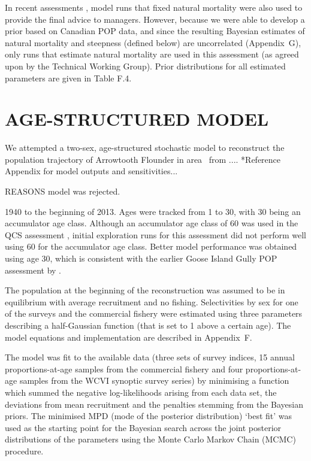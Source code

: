 In recent assessments , model runs that fixed natural mortality were also used to provide the final advice to managers. However, because we were able to develop a prior based on Canadian POP data, and since the resulting Bayesian estimates of natural mortality and steepness (defined below) are uncorrelated (Appendix~G), only runs that estimate natural mortality are used in this assessment (as agreed upon by the Technical Working Group). Prior distributions for all estimated parameters are given in Table F.4.

\section{AGE-STRUCTURED MODEL}

We attempted a two-sex, age-structured stochastic model to reconstruct the population trajectory of Arrowtooth Flounder in area \area~from ....
*Reference Appendix for model outputs and sensitivities...

REASONS model was rejected.

1940 to the beginning of 2013. Ages were tracked from 1 to 30, with 30 being an accumulator age class. Although an accumulator age class of 60 was used in the QCS assessment , initial exploration runs for this assessment did not perform well using 60 for the accumulator age class. Better model performance was obtained using age 30, which is consistent with the earlier Goose Island Gully POP assessment by . 

The population at the beginning of the reconstruction was assumed to be in equilibrium with average recruitment and no fishing. Selectivities by sex for one of the surveys and the commercial fishery were estimated using three parameters describing a half-Gaussian function (that is set to 1 above a certain age). The model equations and implementation are described in Appendix~F.

The model was fit to the available data (three sets of survey indices, 15 annual proportions-at-age samples from the commercial fishery and four proportions-at-age samples from the WCVI synoptic survey series) by minimising a function which summed the negative log-likelihoods arising from each data set, the deviations from mean recruitment and the penalties stemming from the Bayesian priors. The minimised MPD (mode of the posterior distribution) `best fit' was used as the starting point for the Bayesian search across the joint posterior distributions of the parameters using the Monte Carlo Markov Chain (MCMC) procedure. 

